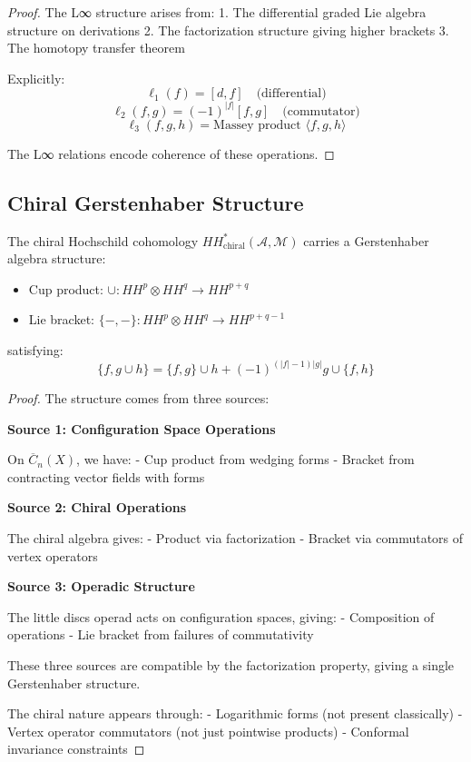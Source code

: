 \begin{proof}
The L∞ structure arises from:
1. The differential graded Lie algebra structure on derivations
2. The factorization structure giving higher brackets
3. The homotopy transfer theorem

Explicitly:
\[
\ell_1(f) = [d, f] \quad \text{(differential)}
\]
\[
\ell_2(f, g) = (-1)^{|f|} [f, g] \quad \text{(commutator)}
\]
\[
\ell_3(f, g, h) = \text{Massey product } \langle f, g, h \rangle
\]

The L∞ relations encode coherence of these operations.
\end{proof}

\subsection{Chiral Gerstenhaber Structure}

\begin{theorem}
The chiral Hochschild cohomology $HH^*_{\text{chiral}}(\mathcal{A}, \mathcal{M})$ carries a Gerstenhaber algebra structure:
\begin{itemize}
\item Cup product: $\cup: HH^p \otimes HH^q \to HH^{p+q}$  
\item Lie bracket: $\{-,-\}: HH^p \otimes HH^q \to HH^{p+q-1}$
\end{itemize}
satisfying:
\[
\{f, g \cup h\} = \{f, g\} \cup h + (-1)^{(|f|-1)|g|} g \cup \{f, h\}
\]
\end{theorem}

\begin{proof}
The structure comes from three sources:

\textbf{Source 1: Configuration Space Operations}

On $\overline{C}_n(X)$, we have:
- Cup product from wedging forms
- Bracket from contracting vector fields with forms

\textbf{Source 2: Chiral Operations}

The chiral algebra gives:
- Product via factorization
- Bracket via commutators of vertex operators

\textbf{Source 3: Operadic Structure}

The little discs operad acts on configuration spaces, giving:
- Composition of operations
- Lie bracket from failures of commutativity

These three sources are compatible by the factorization property, giving a single Gerstenhaber structure.

The chiral nature appears through:
- Logarithmic forms (not present classically)
- Vertex operator commutators (not just pointwise products)
- Conformal invariance constraints
\end{proof}

